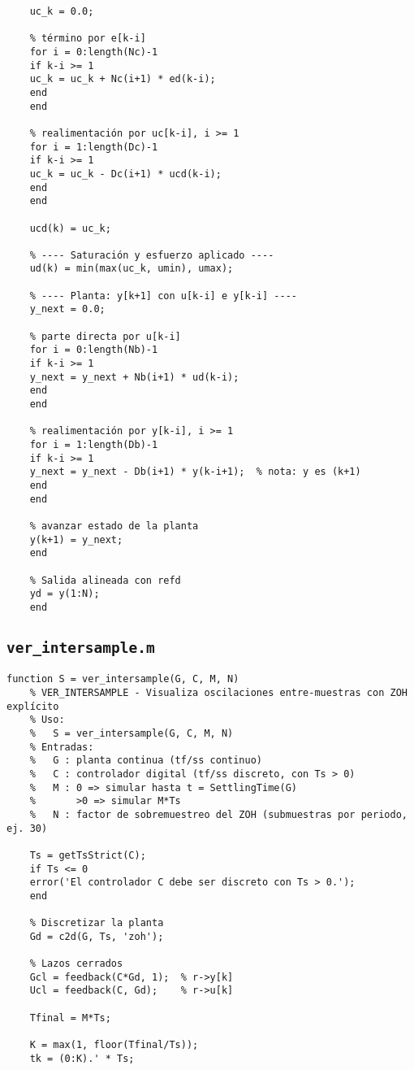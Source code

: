{\begin{lstlisting}[style=matlabstyle,caption={Simulación de lazo discreto con saturación.}]
	% ---- Controlador (sin saturación): uc[k] ----
	uc_k = 0.0;
	
	% término por e[k-i]
	for i = 0:length(Nc)-1
	if k-i >= 1
	uc_k = uc_k + Nc(i+1) * ed(k-i);
	end
	end
	
	% realimentación por uc[k-i], i >= 1
	for i = 1:length(Dc)-1
	if k-i >= 1
	uc_k = uc_k - Dc(i+1) * ucd(k-i);
	end
	end
	
	ucd(k) = uc_k;
	
	% ---- Saturación y esfuerzo aplicado ----
	ud(k) = min(max(uc_k, umin), umax);
	
	% ---- Planta: y[k+1] con u[k-i] e y[k-i] ----
	y_next = 0.0;
	
	% parte directa por u[k-i]
	for i = 0:length(Nb)-1
	if k-i >= 1
	y_next = y_next + Nb(i+1) * ud(k-i);
	end
	end
	
	% realimentación por y[k-i], i >= 1
	for i = 1:length(Db)-1
	if k-i >= 1
	y_next = y_next - Db(i+1) * y(k-i+1);  % nota: y es (k+1)
	end
	end
	
	% avanzar estado de la planta
	y(k+1) = y_next;
	end
	
	% Salida alineada con refd
	yd = y(1:N);
	end
\end{lstlisting}

\subsection{\texttt{ver\_intersample.m}}
\begin{lstlisting}[style=matlabstyle,caption={Visualización del comportamiento inter-muestra.}]
	function S = ver_intersample(G, C, M, N)
	% VER_INTERSAMPLE - Visualiza oscilaciones entre-muestras con ZOH explícito
	% Uso:
	%   S = ver_intersample(G, C, M, N)
	% Entradas:
	%   G : planta continua (tf/ss continuo)
	%   C : controlador digital (tf/ss discreto, con Ts > 0)
	%   M : 0 => simular hasta t = SettlingTime(G)
	%       >0 => simular M*Ts
	%   N : factor de sobremuestreo del ZOH (submuestras por periodo, ej. 30)
	
	Ts = getTsStrict(C);
	if Ts <= 0
	error('El controlador C debe ser discreto con Ts > 0.');
	end
	
	% Discretizar la planta
	Gd = c2d(G, Ts, 'zoh');
	
	% Lazos cerrados
	Gcl = feedback(C*Gd, 1);  % r->y[k]
	Ucl = feedback(C, Gd);    % r->u[k]
	
	Tfinal = M*Ts;
	
	K = max(1, floor(Tfinal/Ts));
	tk = (0:K).' * Ts;
	

\end{lstlisting}}
